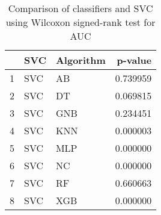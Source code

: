 \begin{table}
\footnotesize
\caption{Comparison of classifiers and SVC using Wilcoxon signed-rank test for AUC}
\label{tab:SVC wilcoxon AUC comparison}
\begin{tabular}{lllr}
\hline
 & SVC & Algorithm & p-value \\
\hline
1 & SVC & AB & 0.739959 \\
2 & SVC & DT & 0.069815 \\
3 & SVC & GNB & 0.234451 \\
4 & SVC & KNN & 0.000003 \\
5 & SVC & MLP & 0.000000 \\
6 & SVC & NC & 0.000000 \\
7 & SVC & RF & 0.660663 \\
8 & SVC & XGB & 0.000000 \\
\hline
\end{tabular}
\end{table}
